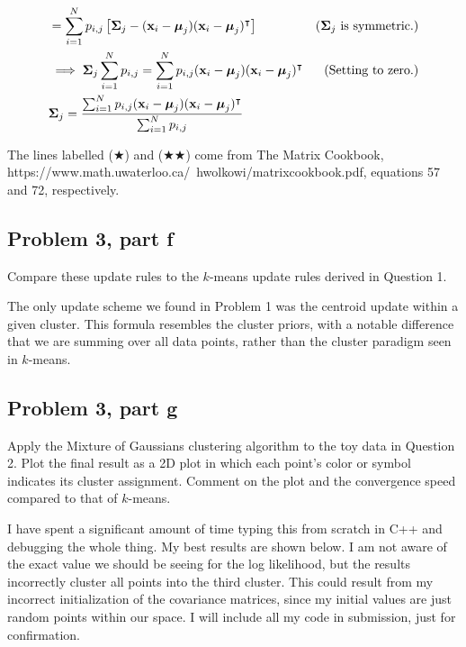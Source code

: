 \begin{solution}
\begin{align*}
        &= \sum_{i = 1}^N p_{i, j} \left[ \boldsymbol{\Sigma}_j - (\textbf{x}_i - \boldsymbol{\mu}_j) (\textbf{x}_i - \boldsymbol{\mu}_j)^{\intercal} \right] &\text{($\boldsymbol{\Sigma}_j$ is symmetric.)}\\
        &\implies \boldsymbol{\Sigma}_j \sum_{i = 1}^N p_{i, j} = \sum_{i = 1}^N p_{i, j}(\textbf{x}_i - \boldsymbol{\mu}_j)(\textbf{x}_i - \boldsymbol{\mu}_j)^{\intercal}  &\text{(Setting to zero.)}\\
        &\boldsymbol{\Sigma}_j = \frac{\sum_{i = 1}^N p_{i, j}(\textbf{x}_i - \boldsymbol{\mu}_j)(\textbf{x}_i - \boldsymbol{\mu}_j)^{\intercal}}{\sum_{i = 1}^N p_{i, j}}
    \end{align*}
    \vspace{-12mm} \alignbreak

    The lines labelled ($\bigstar$) and ($\bigstar \bigstar$) come from The Matrix Cookbook, https://www.math.uwaterloo.ca/~hwolkowi/matrixcookbook.pdf, equations 57 and 72, respectively.  
\end{solution}

\newpage
\subsection{Problem 3, part f}
Compare these update rules to the $k$-means update rules derived in Question 1. 
\partbreak
\begin{solution}

    The only update scheme we found in Problem 1 was the centroid update within a given cluster. This formula resembles the cluster priors, with a notable difference that we are summing over all data points, rather than the cluster paradigm seen in $k$-means.   
\end{solution}

\newpage
\subsection{Problem 3, part g}
Apply the Mixture of Gaussians clustering algorithm to the toy data in Question 2. Plot the final result as a 2D plot in which each point's color or symbol indicates its cluster assignment. Comment on the plot and the convergence speed compared to that of $k$-means. 
\partbreak

\begin{solution}

    I have spent a significant amount of time typing this from scratch in C++ and debugging the whole thing. My best results are shown below. I am not aware of the exact value we should be seeing for the log likelihood, but the results incorrectly cluster all points into the third cluster. This could result from my incorrect initialization of the covariance matrices, since my initial values are just random points within our space. I will include all my code in submission, just for confirmation. 
\end{solution}

